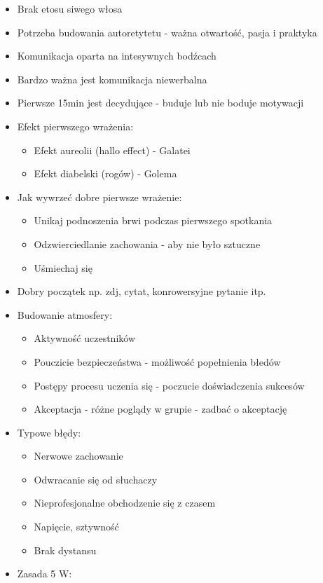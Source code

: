 \documentclass[]{article}
\begin{document}
\begin{itemize}
	\item Brak etosu siwego włosa
	\item Potrzeba budowania autoretytetu - ważna otwartość, pasja i praktyka
	\item Komunikacja oparta na intesywnych bodźcach
	\item Bardzo ważna jest komunikacja niewerbalna
	\item Pierwsze 15min jest decydujące - buduje lub nie boduje motywacji
	\item Efekt pierwszego wrażenia:
	\begin{itemize}
		\item Efekt aureolii (hallo effect) - Galatei
		\item Efekt diabelski (rogów) - Golema
	\end{itemize}
	\item Jak wywrzeć dobre pierwsze wrażenie:
	\begin{itemize}
		\item Unikaj podnoszenia brwi podczas pierwszego spotkania
		\item Odzwierciedlanie zachowania - aby nie było sztuczne
		\item Uśmiechaj się
	\end{itemize}
	\item Dobry początek np. zdj, cytat, konrowersyjne pytanie itp. 
	\item Budowanie atmosfery:
	\begin{itemize}
		\item Aktywność uczestników
		\item Pouczicie bezpieczeństwa - możliwość popełnienia błedów
		\item Postępy procesu uczenia się - poczucie doświadczenia sukcesów
		\item Akceptacja - różne poglądy w grupie - zadbać o akceptację
	\end{itemize}
	\item Typowe błędy:
	\begin{itemize}
		\item Nerwowe zachowanie
		\item Odwracanie się od słuchaczy
		\item Nieprofesjonalne obchodzenie się z czasem
		\item Napięcie, sztywność
		\item Brak dystansu
	\end{itemize}
	\item Zasada 5 W:

\end{itemize}
\end{document}
